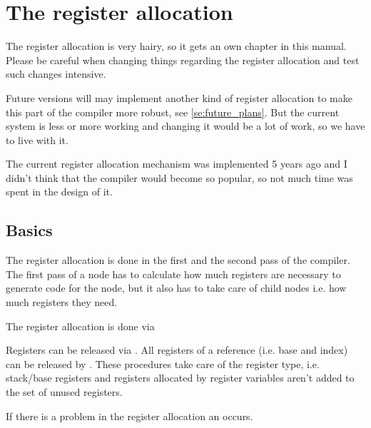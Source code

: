 \documentclass{report}
\begin{document}

\chapter{The register allocation}

The register allocation is very hairy, so it gets
an own chapter in this manual. Please be careful when changing things
regarding the register allocation and test such changes intensive.

Future versions will may implement another kind of register allocation
to make this part of the compiler more robust, see
\ref{se:future_plans}. But the current
system is less or more working and changing it would be a lot of
work, so we have to live with it.

The current register allocation mechanism was implemented 5 years
ago and I didn't think that the compiler would become
so popular, so not much time was spent in the design of it.

\section{Basics}

The register allocation is done in the first and the second pass of
the compiler.
The first pass of a node has to calculate how much registers
are necessary to generate code for the node, but it also has
to take care of child nodes i.e. how much registers
they need.

The register allocation is done via 

Registers can be released via . All registers
of a reference (i.e. base and index) can be released by
. These procedures take care of the register type,
i.e. stack/base registers and registers allocated by register
variables aren't added to the set of unused registers.

If there is a problem in the register allocation an 
occurs.
\end{document}
